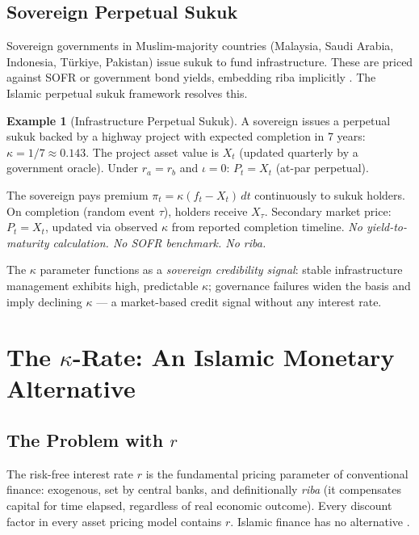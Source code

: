 \documentclass[10pt,twocolumn]{article}
\theoremstyle{plain}
\theoremstyle{definition}
\newtheorem{example}{Example}
\begin{document}
\subsection{Sovereign Perpetual Sukuk}
\label{sec:sovereign}

Sovereign governments in Muslim-majority countries (Malaysia,
Saudi Arabia, Indonesia, Türkiye, Pakistan) issue sukuk to fund
infrastructure. These are priced against SOFR or government bond
yields, embedding riba implicitly \cite{IIFM2023,IFSB2024}.
The Islamic perpetual sukuk framework resolves this.

\begin{example}[Infrastructure Perpetual Sukuk]
A sovereign issues a perpetual sukuk backed by a highway
project with expected completion in 7 years:
$\kappa = 1/7 \approx 0.143$. The project asset value is $X_t$
(updated quarterly by a government oracle). Under $r_a = r_b$
and $\iota = 0$: $P_t = X_t$ (at-par perpetual).

The sovereign pays premium $\pi_t = \kappa(f_t - X_t)\,dt$
continuously to sukuk holders. On completion (random event $\tau$),
holders receive $X_\tau$. Secondary market price: $P_t = X_t$,
updated via observed $\kappa$ from reported completion timeline.
\emph{No yield-to-maturity calculation. No SOFR benchmark. No riba.}
\end{example}

The $\kappa$ parameter functions as a \textit{sovereign credibility
signal}: stable infrastructure management exhibits high, predictable
$\kappa$; governance failures widen the basis and imply declining
$\kappa$ --- a market-based credit signal without any interest rate.

\section{The $\kappa$-Rate: An Islamic Monetary Alternative}
\label{sec:kappa_rate}

\subsection{The Problem with $r$}

The risk-free interest rate $r$ is the fundamental pricing
parameter of conventional finance: exogenous, set by central banks,
and definitionally \textit{riba} (it compensates capital for time
elapsed, regardless of real economic outcome). Every discount factor
in every asset pricing model contains $r$. Islamic finance has no
alternative \cite{Chapra1985,IqbalMirakhor2011}.
\end{document}

